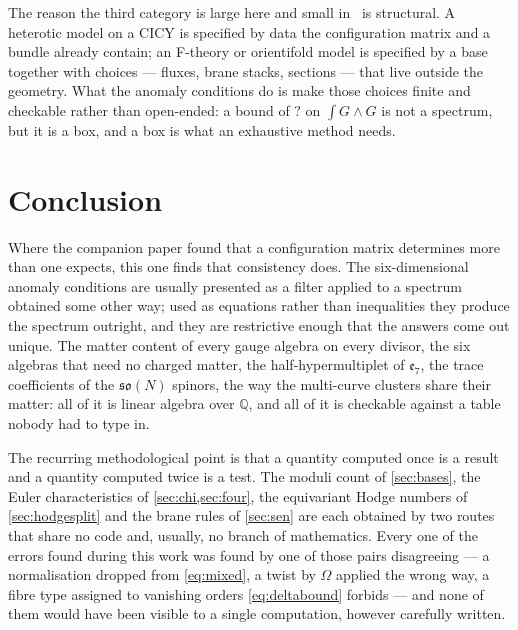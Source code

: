 \documentclass[11pt,a4paper]{article}
\newcommand{\SFPThreeFluxBound}{?}\newcommand{\SFQuinticFixedChi}{?}
\newcommand{\g}[1]{\mathfrak{#1}}
\theoremstyle{definition}
\begin{document}
\noindent
The reason the third category is large here and small in~\cite{SuppMath} is
structural. A heterotic model on a CICY is specified by data the configuration
matrix and a bundle already contain; an F-theory or orientifold model is
specified by a base together with choices --- fluxes, brane stacks, sections
--- that live outside the geometry. What the anomaly conditions do is make
those choices finite and checkable rather than open-ended: a bound of
$\SFPThreeFluxBound$ on $\int G \wedge G$ is not a spectrum, but it is a box,
and a box is what an exhaustive method needs.


\section{Conclusion}
\label{sec:conclusion}

Where the companion paper found that a configuration matrix determines more
than one expects, this one finds that consistency does. The six-dimensional
anomaly conditions are usually presented as a filter applied to a spectrum
obtained some other way; used as equations rather than inequalities they
produce the spectrum outright, and they are restrictive enough that the
answers come out unique. The matter content of every gauge algebra on every
divisor, the six algebras that need no charged matter, the half-hypermultiplet
of $\g{e}_7$, the trace coefficients of the $\g{so}(N)$ spinors, the way the
multi-curve clusters share their matter: all of it is linear algebra over
$\mathbb{Q}$, and all of it is checkable against a table nobody had to type
in.

The recurring methodological point is that a quantity computed once is a
result and a quantity computed twice is a test. The moduli count of
\cref{sec:bases}, the Euler characteristics of \cref{sec:chi,sec:four}, the
equivariant Hodge numbers of \cref{sec:hodgesplit} and the brane rules of
\cref{sec:sen} are each obtained by two routes that share no code and,
usually, no branch of mathematics. Every one of the errors found during this
work was found by one of those pairs disagreeing --- a normalisation dropped
from \cref{eq:mixed}, a twist by $\Omega$ applied the wrong way, a fibre type
assigned to vanishing orders \cref{eq:deltabound} forbids --- and none of them
would have been visible to a single computation, however carefully written.

\end{document}
